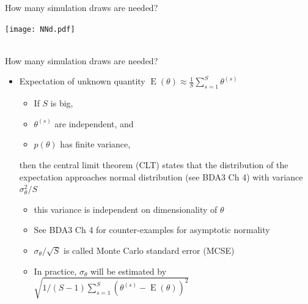 \documentclass[english,t]{beamer}
\DeclareMathOperator{\E}{E}
\begin{document}
\begin{frame}{How many simulation draws are needed?}
\begin{itemize}
{      \texttt{[image: NNd.pdf]}\\ \vspace{-0.5\baselineskip}\footnotesize ~
    }
\end{itemize}

\end{frame}

\begin{frame}{How many simulation draws are needed?}

  \begin{itemize}
  \item Expectation of unknown quantity $\E(\theta)\approx \frac{1}{S}\sum_{s=1}^S \theta^{(s)}$
    \begin{itemize}
    \item If $S$ is big,
    \item $\theta^{(s)}$ are independent, and 
    \item $p(\theta)$ has finite variance,
    \end{itemize}
    then the central limit theorem (CLT) states
    that the distribution of the expectation approaches normal
    distribution (see BDA3 Ch 4) with variance $\sigma^2_\theta/S$
    \begin{itemize}
    \item<1-> this variance is independent on dimensionality of $\theta$
    \item<2-> See BDA3 Ch 4 for counter-examples for asymptotic normality
      \pause
    \item<3-> $\sigma_\theta/\sqrt{S}$ is called Monte Carlo standard
      error (MCSE)
      \item<4-> In practice, $\sigma_{\theta}$ will be estimated by $ \sqrt{1/(S-1)\sum_{s = 1}^S (\theta^{(s)} - \E(\theta))^2}$
    \end{itemize}
\end{itemize}

\end{frame}
\end{document}

